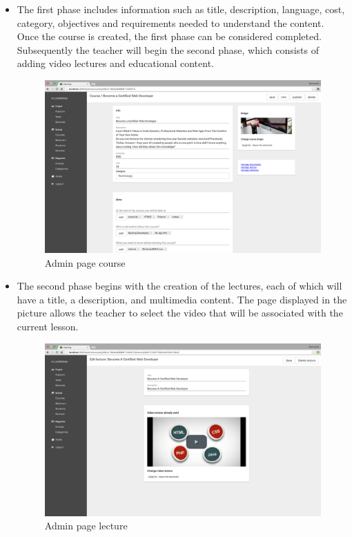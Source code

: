 \begin{itemize}
\item The first phase includes information such as title, description, language, cost, category, objectives and requirements needed to understand the content. Once the course is created, the first phase can be considered completed.
Subsequently the teacher will begin the second phase, which consists of adding video lectures and educational content.

\begin{figure}[htb]
 \centering
 \includegraphics[width=1.0\linewidth]{images/chapter5/page-course-admin.png}\hfill
 \caption[Admin page course]{Admin page course}
 \label{fig:fourV}
\end{figure}

\item The second phase begins with the creation of the lectures, each of which will have a title, a description, and multimedia content.
The page displayed in the picture allows the teacher to select the video that will be associated with the current lesson.

\begin{figure}[htb]
 \centering
 \includegraphics[width=1.0\linewidth]{images/chapter5/page-lecture-admin.png}\hfill
 \caption[Admin page lecture]{Admin page lecture}
 \label{fig:fourV}
\end{figure}

\end{itemize}

